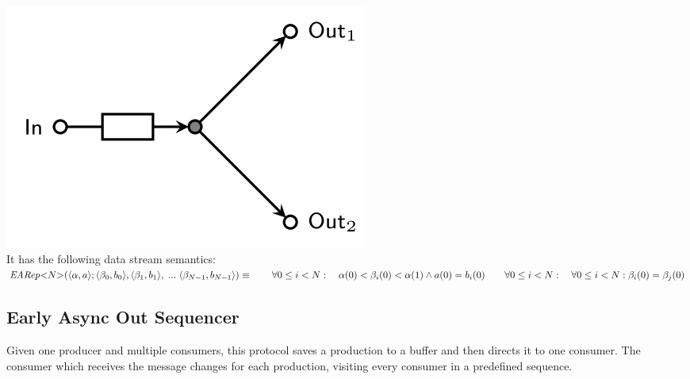 \includegraphics[]{img/EARep.png}\\
%
It has the following data stream semantics:\\
%
$
\vspace{0.2cm}\mathit{EARep}{<}N{>}(\langle \alpha, a \rangle ; \langle \beta_0, b_0 \rangle, \langle \beta_1, b_1 \rangle,\; ... \; \langle \beta_{N-1}, b_{N-1} \rangle) \equiv \\
\vspace{0.2cm} \hphantom \qquad \forall 0 \leq i < N : \quad \alpha(0) < \beta_i(0) < \alpha(1) \land a(0) = b_i(0) \\
\hphantom \qquad\forall 0 \leq i < N :\quad \forall 0 \leq i < N : \beta_i(0) = \beta_j(0)
$\\

\subsection{Early Async Out Sequencer}
Given one producer and multiple consumers, this protocol saves a production to a buffer and then directs it to one consumer. The consumer which receives the message changes for each production, visiting every consumer in a predefined sequence.\\

